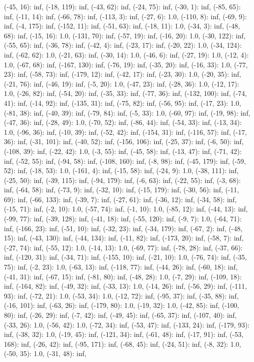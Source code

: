 \documentclass[parskip=half]{scrartcl}
\begin{document}
(-45, 16): inf, (-18, 119): inf, (-43, 62): inf, (-24, 75): inf, (-30, 1): inf, (-85, 65): inf, (-11, 14): inf, (-66, 78): inf, (-113, 3): inf, (-27, 6): 1.0, (-110, 8): inf, (-69, 9): inf, (-4, 175): inf, (-152, 11): inf, (-51, 63): inf, (-18, 11): 1.0, (-34, 3): inf, (-48, 68): inf, (-15, 16): 1.0, (-131, 70): inf, (-57, 19): inf, (-16, 20): 1.0, (-30, 122): inf, (-55, 65): inf, (-36, 78): inf, (-42, 4): inf, (-23, 17): inf, (-20, 22): 1.0, (-34, 124): inf, (-62, 62): 1.0, (-21, 63): inf, (-30, 14): 1.0, (-46, 6): inf, (-27, 19): 1.0, (-12, 4): 1.0, (-67, 68): inf, (-167, 130): inf, (-76, 19): inf, (-35, 20): inf, (-16, 33): 1.0, (-77, 23): inf, (-58, 73): inf, (-179, 12): inf, (-42, 17): inf, (-23, 30): 1.0, (-20, 35): inf, (-21, 76): inf, (-46, 19): inf, (-5, 20): 1.0, (-47, 23): inf, (-28, 36): 1.0, (-12, 17): 1.0, (-26, 82): inf, (-54, 20): inf, (-35, 33): inf, (-77, 36): inf, (-132, 100): inf, (-74, 41): inf, (-14, 92): inf, (-135, 31): inf, (-75, 82): inf, (-56, 95): inf, (-17, 23): 1.0, (-81, 38): inf, (-40, 39): inf, (-79, 84): inf, (-5, 33): 1.0, (-60, 97): inf, (-19, 98): inf, (-47, 36): inf, (-28, 49): 1.0, (-70, 52): inf, (-86, 44): inf, (-54, 33): inf, (-13, 34): 1.0, (-96, 36): inf, (-10, 39): inf, (-52, 42): inf, (-154, 31): inf, (-116, 57): inf, (-17, 36): inf, (-31, 101): inf, (-40, 52): inf, (-156, 106): inf, (-25, 37): inf, (-6, 50): inf, (-108, 39): inf, (-22, 42): 1.0, (-3, 55): inf, (-45, 58): inf, (-13, 47): inf, (-71, 42): inf, (-52, 55): inf, (-94, 58): inf, (-108, 160): inf, (-8, 98): inf, (-45, 179): inf, (-59, 52): inf, (-18, 53): 1.0, (-161, 4): inf, (-15, 58): inf, (-24, 9): 1.0, (-38, 111): inf, (-25, 50): inf, (-39, 115): inf, (-94, 179): inf, (-6, 63): inf, (-22, 55): inf, (-3, 68): inf, (-64, 58): inf, (-73, 9): inf, (-32, 10): inf, (-15, 179): inf, (-30, 56): inf, (-11, 69): inf, (-66, 133): inf, (-39, 7): inf, (-27, 61): inf, (-36, 12): inf, (-34, 58): inf, (-15, 71): inf, (-2, 10): 1.0, (-57, 74): inf, (-1, 10): 1.0, (-85, 12): inf, (-44, 13): inf, (-99, 77): inf, (-39, 128): inf, (-41, 18): inf, (-55, 120): inf, (-9, 7): 1.0, (-64, 71): inf, (-166, 23): inf, (-51, 10): inf, (-32, 23): inf, (-34, 179): inf, (-67, 2): inf, (-48, 15): inf, (-43, 130): inf, (-44, 134): inf, (-11, 82): inf, (-173, 20): inf, (-58, 7): inf, (-27, 74): inf, (-55, 12): 1.0, (-14, 13): 1.0, (-69, 77): inf, (-78, 28): inf, (-37, 66): inf, (-120, 31): inf, (-34, 71): inf, (-155, 10): inf, (-21, 10): 1.0, (-76, 74): inf, (-35, 75): inf, (-2, 23): 1.0, (-63, 13): inf, (-118, 77): inf, (-44, 26): inf, (-60, 18): inf, (-41, 31): inf, (-67, 15): inf, (-81, 80): inf, (-48, 28): 1.0, (-7, 29): inf, (-109, 18): inf, (-164, 82): inf, (-49, 32): inf, (-33, 13): 1.0, (-14, 26): inf, (-56, 29): inf, (-111, 93): inf, (-72, 21): 1.0, (-53, 34): 1.0, (-12, 72): inf, (-95, 37): inf, (-35, 88): inf, (-16, 101): inf, (-63, 26): inf, (-179, 80): 1.0, (-19, 32): 1.0, (-42, 85): inf, (-100, 80): inf, (-26, 29): inf, (-7, 42): inf, (-49, 45): inf, (-65, 37): inf, (-107, 40): inf, (-33, 26): 1.0, (-56, 42): 1.0, (-72, 34): inf, (-53, 47): inf, (-133, 24): inf, (-179, 93): inf, (-38, 32): 1.0, (-19, 45): inf, (-121, 34): inf, (-61, 48): inf, (-17, 91): inf, (-53, 168): inf, (-26, 42): inf, (-95, 171): inf, (-68, 45): inf, (-24, 51): inf, (-8, 32): 1.0, (-50, 35): 1.0, (-31, 48): inf, 
\end{document}
